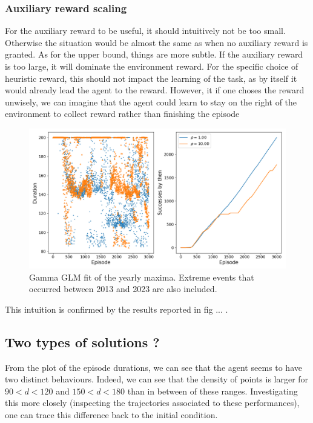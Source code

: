 \documentclass[a4paper, 12pt,oneside]{article}
\begin{document}
        \subsubsection{Auxiliary reward scaling}
        For the auxiliary reward to be useful, it should intuitively not be too small. Otherwise the situation would be almost the same as when no auxiliary reward is granted. As for the upper bound, things are more subtle. If the auxiliary reward is too large, it will dominate the environment reward. For the specific choice of heuristic reward, this should not impact the learning of the task, as by itself it would already lead the agent to the reward. However, it if one choses the reward unwisely, we can imagine that the agent could learn to stay on the right of the environment to collect reward rather than finishing the episode
        \begin{figure}[h!]
            \centering
            \vspace{0em}
            \includegraphics[width=.75\textwidth]{../runs/dqn_heuristic/comparison}
            \caption{Gamma GLM fit of the yearly maxima. Extreme events that occurred between 2013 and 2023 are also included.}
            \label{fig:dqn-heuristic-comparison}
        \end{figure}
        This intuition is confirmed by the results reported in fig ... . 
        \subsection{Two types of solutions ?}
        From the plot of the episode durations, we can see that the agent seems to have two distinct behaviours. Indeed, we can see that the density of points is larger for $90<d<120$ and $150<d<180$ than in between of these ranges. Investigating this more closely (inspecting the trajectories associated to these performances), one can trace this difference back to the initial condition. 
        
\end{document}

